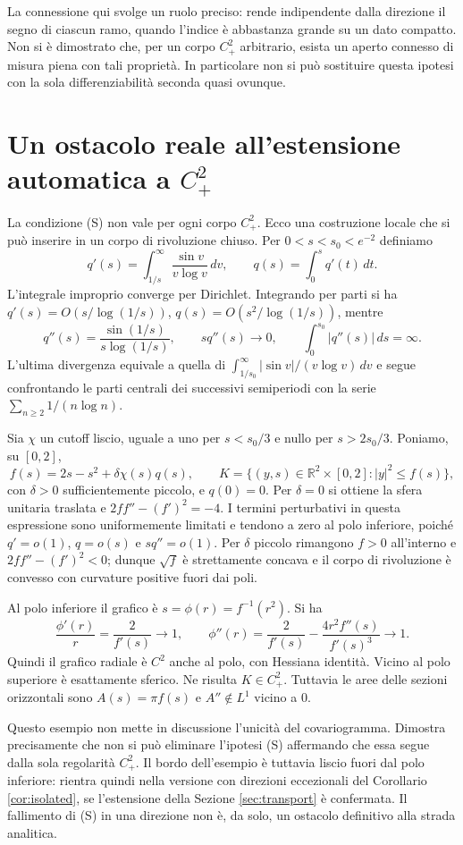 \documentclass[11pt,a4paper]{article}
\theoremstyle{remark}
\newcommand{\R}{\mathbb R}
\begin{document}
La connessione qui svolge un ruolo preciso: rende indipendente dalla
direzione il segno di ciascun ramo, quando l'indice è abbastanza grande
su un dato compatto. Non si è dimostrato che, per un corpo $C^2_+$
arbitrario, esista un aperto connesso di misura piena con tali proprietà.
In particolare non si può sostituire questa ipotesi con la sola
differenziabilità seconda quasi ovunque.

\section{Un ostacolo reale all'estensione automatica a $C^2_+$}
\label{sec:nonlone}
La condizione (S) non vale per ogni corpo $C^2_+$. Ecco una costruzione
locale che si può inserire in un corpo di rivoluzione chiuso.
Per $0<s<s_0<e^{-2}$ definiamo
\[
q'(s)=\int_{1/s}^{\infty}\frac{\sin v}{v\log v}\,dv,
\qquad q(s)=\int_0^s q'(t)\,dt.
\]
L'integrale improprio converge per Dirichlet. Integrando per parti si ha
$q'(s)=O(s/\log(1/s))$, $q(s)=O(s^2/\log(1/s))$, mentre
\[
q''(s)=\frac{\sin(1/s)}{s\log(1/s)},\qquad
s q''(s)\longrightarrow0,
\qquad\int_0^{s_0}|q''(s)|\,ds=\infty.
\]
L'ultima divergenza equivale a quella di
$\int_{1/s_0}^{\infty}|\sin v|/(v\log v)\,dv$ e segue confrontando
le parti centrali dei successivi semiperiodi con la serie
$\sum_{n\geq2}1/(n\log n)$.

Sia $\chi$ un cutoff liscio, uguale a uno per $s<s_0/3$ e nullo per
$s>2s_0/3$. Poniamo, su $[0,2]$,
\[
f(s)=2s-s^2+\delta\chi(s)q(s),\qquad
K=\{(y,s)\in\R^2\times[0,2]: |y|^2\leq f(s)\},
\]
con $\delta>0$ sufficientemente piccolo, e $q(0)=0$.
Per $\delta=0$ si ottiene la sfera unitaria traslata e
$2ff''-(f')^2=-4$. I termini perturbativi in questa espressione sono
uniformemente limitati e tendono a zero al polo inferiore, poiché
$q'=o(1)$, $q=o(s)$ e $s q''=o(1)$. Per $\delta$ piccolo rimangono
$f>0$ all'interno e $2ff''-(f')^2<0$; dunque $\sqrt f$ è strettamente
concava e il corpo di rivoluzione è convesso con curvature positive
fuori dai poli.

Al polo inferiore il grafico è $s=\phi(r)=f^{-1}(r^2)$. Si ha
\[
\frac{\phi'(r)}r=\frac2{f'(s)}\longrightarrow1,
\qquad
\phi''(r)=\frac2{f'(s)}-\frac{4r^2 f''(s)}{f'(s)^3}
\longrightarrow1.
\]
Quindi il grafico radiale è $C^2$ anche al polo, con Hessiana identità.
Vicino al polo superiore è esattamente sferico. Ne risulta $K\in C^2_+$.
Tuttavia le aree delle sezioni orizzontali sono $A(s)=\pi f(s)$ e
$A''\notin L^1$ vicino a $0$.

Questo esempio non mette in discussione l'unicità del covariogramma.
Dimostra precisamente che non si può eliminare l'ipotesi (S) affermando
che essa segue dalla sola regolarità $C^2_+$.
Il bordo dell'esempio è tuttavia liscio fuori dal polo inferiore:
rientra quindi nella versione con direzioni eccezionali del Corollario
\ref{cor:isolated}, se l'estensione della Sezione \ref{sec:transport}
è confermata. Il fallimento di (S) in una direzione non è, da solo,
un ostacolo definitivo alla strada analitica.
\end{document}
